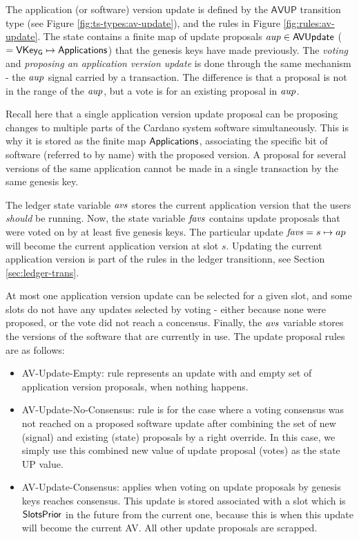 The application (or software) version update is defined by the $\mathsf{AVUP}$
transition type (see Figure \ref{fig:ts-types:av-update}), and the rules in
Figure \ref{fig:rules:av-update}.
The state contains a finite map of update proposals
$\mathit{aup} \in \mathsf{AVUpdate}$ ($= \mathsf{VKey_G} \mapsto \mathsf{Applications}$) that the genesis keys have
made previously.
The \textit{voting} and \textit{proposing an application version update} is done through the same
mechanism - the $\mathit{aup}$ signal carried by a transaction. The difference
is that a proposal is not in the
range of the $\mathit{aup}$, but a vote is for an existing proposal
in $\mathit{aup}$.

Recall here that a single application version update proposal can be
proposing changes to multiple parts of the Cardano system software simultaneously.
This is why it is stored as the finite map $\mathsf{Applications}$, associating the
specific bit of software (referred to by name) with the proposed version.
A proposal for several versions of the same application cannot be made in
a single transaction by the same genesis key.

The ledger state variable $\mathit{avs}$ stores the current application version
that the users \textit{should} be running.
Now, the state variable $\mathit{favs}$ contains update proposals that
were voted on by at least five genesis keys.
The particular update $\mathit{favs} = s \mapsto ap$ will become
the current application version at slot $s$.
Updating the current application version is part of the rules in the ledger transitionn,
see Section \ref{sec:ledger-trans}.

At most one application version update
can be selected for a given slot, and some slots do not have any
updates selected by voting - either because none were proposed, or the vote
did not reach a concensus. Finally, the $\mathit{avs}$ variable stores
the versions of the software that are currently in use. The update
proposal rules are as follows:

\begin{itemize}
  \item AV-Update-Empty: rule represents an update with
and empty set of application version proposals, when nothing happens.
  \item AV-Update-No-Consensus: rule
is for the case where a voting consensus was not reached on a proposed software
update after combining the set of new (signal) and existing (state) proposals
by a right override. In this case, we simply use this combined new value
of update proposal (votes) as the state UP value.
  \item AV-Update-Consensus: applies when voting on update proposals by genesis keys
reaches consensus. This update is stored associated with a slot which is
$\mathsf{SlotsPrior}$ in the future from the current one, because this is when
this update will become the current AV.
All other update proposals are scrapped.
\end{itemize}


